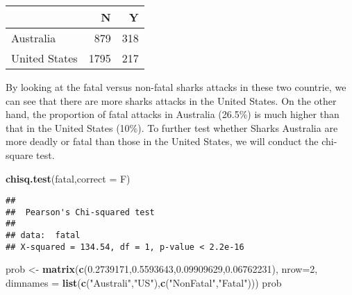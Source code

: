 \documentclass[]{article}
\newenvironment{Shaded}{\begin{snugshade}}{\end{snugshade}}
\newcommand{\KeywordTok}[1]{\textcolor[rgb]{0.13,0.29,0.53}{\textbf{#1}}}
\newcommand{\DataTypeTok}[1]{\textcolor[rgb]{0.13,0.29,0.53}{#1}}
\newcommand{\DecValTok}[1]{\textcolor[rgb]{0.00,0.00,0.81}{#1}}
\newcommand{\FloatTok}[1]{\textcolor[rgb]{0.00,0.00,0.81}{#1}}
\newcommand{\StringTok}[1]{\textcolor[rgb]{0.31,0.60,0.02}{#1}}
\newcommand{\OperatorTok}[1]{\textcolor[rgb]{0.81,0.36,0.00}{\textbf{#1}}}
\newcommand{\NormalTok}[1]{#1}
\begin{document}
\begin{Shaded}
\end{Shaded}

\begin{longtable}[]{@{}lrr@{}}
\toprule
& N & Y\tabularnewline
\midrule
\endhead
Australia & 879 & 318\tabularnewline
United States & 1795 & 217\tabularnewline
\bottomrule
\end{longtable}

By looking at the fatal versus non-fatal sharks attacks in these two
countrie, we can see that there are more sharks attacks in the United
States. On the other hand, the proportion of fatal attacks in Australia
(26.5\%) is much higher than that in the United States (10\%). To
further test whether Sharks Australia are more deadly or fatal than
those in the United States, we will conduct the chi-square test.

\begin{Shaded}
\begin{Highlighting}[]
\KeywordTok{chisq.test}\NormalTok{(fatal,}\DataTypeTok{correct =}\NormalTok{ F)}
\end{Highlighting}
\end{Shaded}

\begin{verbatim}
## 
##  Pearson's Chi-squared test
## 
## data:  fatal
## X-squared = 134.54, df = 1, p-value < 2.2e-16
\end{verbatim}

\begin{Shaded}
\begin{Highlighting}[]
\NormalTok{prob <-}\StringTok{ }\KeywordTok{matrix}\NormalTok{(}\KeywordTok{c}\NormalTok{(}\FloatTok{0.2739171}\NormalTok{,}\FloatTok{0.5593643}\NormalTok{,}\FloatTok{0.09909629}\NormalTok{,}\FloatTok{0.06762231}\NormalTok{), }\DataTypeTok{nrow=}\DecValTok{2}\NormalTok{, }
               \DataTypeTok{dimnames =} \KeywordTok{list}\NormalTok{(}\KeywordTok{c}\NormalTok{(}\StringTok{"Australi"}\NormalTok{,}\StringTok{"US"}\NormalTok{),}\KeywordTok{c}\NormalTok{(}\StringTok{"NonFatal"}\NormalTok{,}\StringTok{"Fatal"}\NormalTok{)))}
\NormalTok{prob}
\end{Highlighting}
\end{Shaded}
\end{document}
